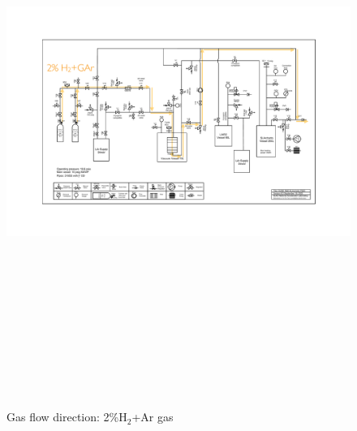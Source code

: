 \documentclass[letterpaper,11pt]{article}
\newcommand{\Hydro}     {H$_2$}
\begin{document}
\begin{figure}[htb]
\begin{center}
\includegraphics[angle=90,origin=c,height=7.3in]{fig/RegenerationH2_PIDv8.3.pdf}
\caption{Gas flow direction: 2\%{\Hydro}+Ar gas}
\label{fig:H2Flow}
\end{center}
\end{figure}
\end{document}
